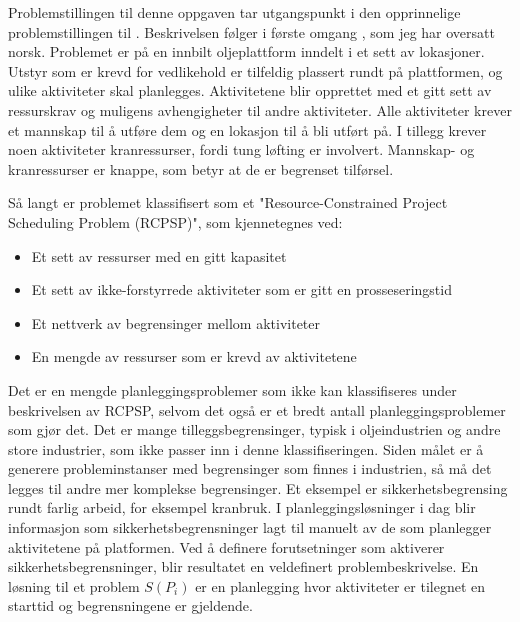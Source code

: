 Problemstillingen til denne oppgaven tar utgangspunkt i den opprinnelige problemstillingen til \bht. Beskrivelsen følger i første omgang \cite{tvedtbezem}, som jeg har oversatt norsk. Problemet er på en innbilt oljeplattform inndelt i et sett av lokasjoner. Utstyr som er krevd for vedlikehold er tilfeldig plassert rundt på plattformen, og ulike aktiviteter skal planlegges. Aktivitetene blir opprettet med et gitt sett av ressurskrav og muligens avhengigheter til andre aktiviteter. Alle aktiviteter krever et mannskap til å utføre dem og en lokasjon til å bli utført på. I tillegg krever noen aktiviteter kranressurser, fordi tung løfting er involvert. Mannskap- og kranressurser er knappe, som betyr at de er begrenset tilførsel.

Så langt er problemet klassifisert som et "Resource-Constrained Project Scheduling Problem (RCPSP)"\cite{RcpspPaperSchutt}, som kjennetegnes ved:
\begin{itemize}
\item Et sett av ressurser med en gitt kapasitet
\item Et sett av ikke-forstyrrede aktiviteter som er gitt en prosseseringstid
\item Et nettverk av begrensinger mellom aktiviteter
\item En mengde av ressurser som er krevd av aktivitetene
\end{itemize}

Det er en mengde planleggingsproblemer som ikke kan klassifiseres under beskrivelsen av RCPSP, selvom det også er et bredt antall planleggingsproblemer som gjør det. Det er mange tilleggsbegrensinger, typisk i oljeindustrien og andre store industrier, som ikke passer inn i denne klassifiseringen. Siden målet er å generere probleminstanser med begrensinger som finnes i industrien, så må det legges til andre mer komplekse begrensinger. Et eksempel  er sikkerhetsbegrensing rundt farlig arbeid, for eksempel kranbruk. I planleggingsløsninger i dag blir informasjon som sikkerhetsbegrensninger lagt til manuelt av de som planlegger aktivitetene på platformen. Ved å definere forutsetninger som aktiverer sikkerhetsbegrensninger, blir resultatet en veldefinert problembeskrivelse. En løsning til et problem $ S(P_{i}) $ er en planlegging hvor aktiviteter er tilegnet en starttid og begrensningene er gjeldende.

